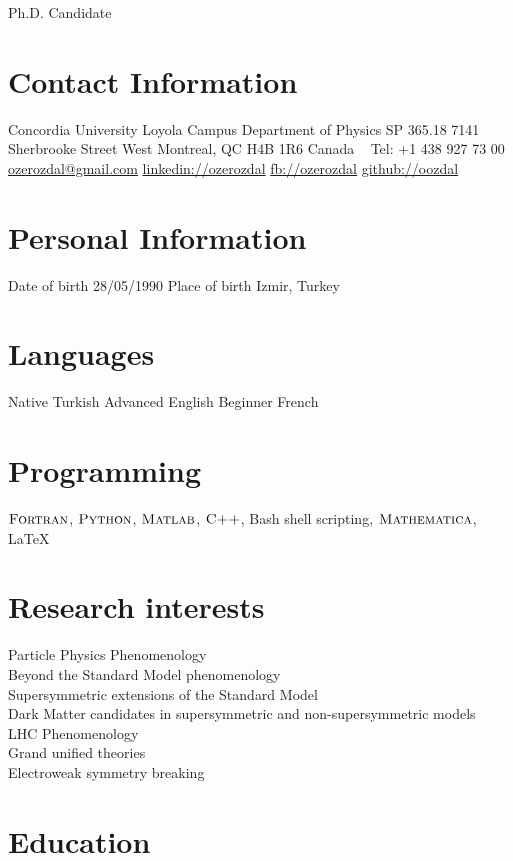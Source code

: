 \documentclass[]{friggeri-cv}
\begin{document}
       {Ph.D. Candidate}


\begin{aside}
  \section{Contact Information}
    Concordia University
    Loyola Campus
    Department of Physics SP 365.18
    7141 Sherbrooke Street West
    Montreal, QC  H4B 1R6
    Canada
    ~
    Tel: +1 438 927 73 00
    \href{mailto:ozerozdal@gmail.com}{ozerozdal@gmail.com}
    \href{http://www.linkedin.com/in/ozerozdal/}{linkedin://ozerozdal}
    \href{http://facebook.com/ozerozdal}{fb://ozerozdal}
    \href{http://github.com/oozdal}{github://oozdal}
  \section{Personal Information}
  	Date of birth 28/05/1990
  	Place of birth
  	Izmir, Turkey
  \section{Languages}
    Native Turkish
    Advanced English 
    Beginner French
  \section{Programming}
    $\textsc{Fortran}$, $\textsc{Python}$, 
    $\textsc{Matlab}$, $\textsc{C++}$,
    Bash shell scripting,
    $\textsc{Mathematica}$, LaTeX
\end{aside}

\section{Research interests}

Particle Physics Phenomenology \\
Beyond the Standard Model phenomenology \\
Supersymmetric extensions of the Standard Model \\
Dark Matter candidates in supersymmetric and non-supersymmetric models  \\
LHC Phenomenology \\
Grand unified theories \\
Electroweak symmetry breaking \\

\section{Education}
\end{document}
